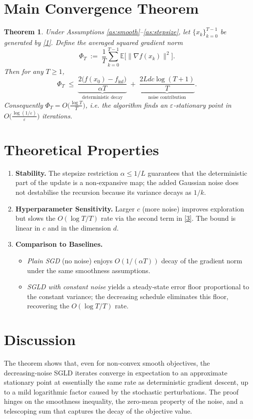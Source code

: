 \documentclass{article}
\newtheorem{theorem}{Theorem}
\begin{document}
\section*{Main Convergence Theorem}
\begin{theorem}\label{thm:main}
Under Assumptions \ref{as:smooth}–\ref{as:stepsize}, let $\{x_{k}\}_{k=0}^{T-1}$ be generated by \eqref{1}. Define the averaged squared gradient norm
\[
\Phi_{T}\;:=\;\frac{1}{T}\sum_{k=0}^{T-1}\mathbb{E}\!\bigl[\|\nabla f(x_{k})\|^{2}\bigr].
\]
Then for any $T\ge 1$,
\[
\Phi_{T}\;\le\;
\underbrace{\frac{2\bigl(f(x_{0})-f_{\inf}\bigr)}{\alpha T}}_{\text{deterministic decay}}
\;+\;
\underbrace{\frac{2L d c\log (T+1)}{T}}_{\text{noise contribution}} .
\tag{3}
\]
Consequently $\Phi_{T}=O\!\bigl(\tfrac{\log T}{T}\bigr)$, i.e. the algorithm finds an $\varepsilon$‑stationary point in $O\!\bigl(\tfrac{\log(1/\varepsilon)}{\varepsilon}\bigr)$ iterations.
\end{theorem}

\section*{Theoretical Properties}
\begin{enumerate}[label=\arabic*)]
\item \textbf{Stability.} The stepsize restriction $\alpha\le 1/L$ guarantees that the deterministic part of the update is a non‑expansive map; the added Gaussian noise does not destabilise the recursion because its variance decays as $1/k$.
\item \textbf{Hyperparameter Sensitivity.} Larger $c$ (more noise) improves exploration but slows the $O(\log T/T)$ rate via the second term in \eqref{3}. The bound is linear in $c$ and in the dimension $d$.
\item \textbf{Comparison to Baselines.}
    \begin{itemize}
        \item \emph{Plain SGD} (no noise) enjoys $O(1/(\alpha T))$ decay of the gradient norm under the same smoothness assumptions.
        \item \emph{SGLD with constant noise} yields a steady‑state error floor proportional to the constant variance; the decreasing schedule eliminates this floor, recovering the $O(\log T/T)$ rate.
    \end{itemize}
\end{enumerate}

\section*{Discussion}
The theorem shows that, even for non‑convex smooth objectives, the decreasing‑noise SGLD iterates converge in expectation to an approximate stationary point at essentially the same rate as deterministic gradient descent, up to a mild logarithmic factor caused by the stochastic perturbations. The proof hinges on the smoothness inequality, the zero‑mean property of the noise, and a telescoping sum that captures the decay of the objective value.
\end{document}
